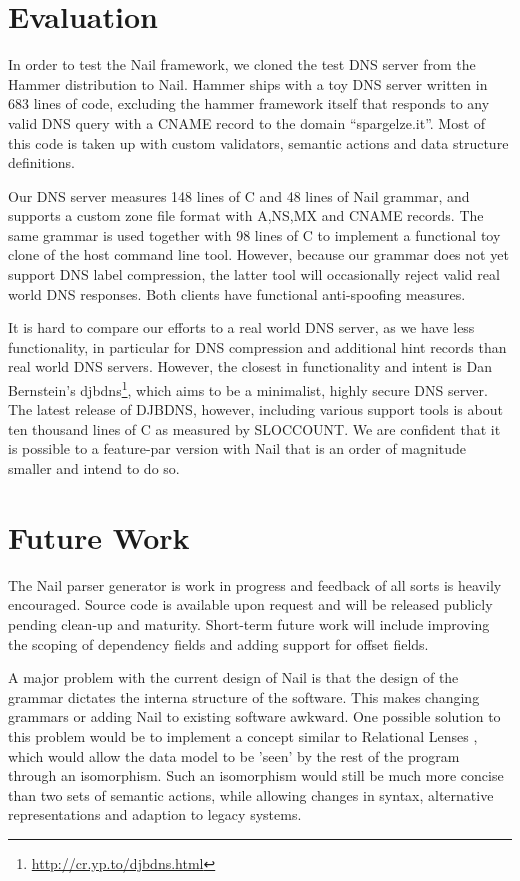 \documentclass[10pt]{article}
\begin{document}
\section{Evaluation}
In order to test the Nail framework, we cloned the test DNS server from the Hammer distribution to
Nail. Hammer ships with a toy DNS server written in 683 lines of code, excluding the hammer
framework itself that responds to any valid DNS query with a CNAME record to the domain
``spargelze.it''.  Most of this code is taken up with custom validators, semantic actions and data
structure definitions. 

Our DNS server measures 148 lines of C and 48 lines of Nail grammar, and supports a custom zone file format
with A,NS,MX and CNAME records. The same grammar is used together with 98 lines of C to implement a
functional toy clone of the host command line tool. However, because our grammar does not yet
support DNS label compression, the latter tool will occasionally reject valid real world DNS
responses. Both clients have functional anti-spoofing measures.

It is hard to compare our efforts to a real world DNS server, as we have less functionality, in
particular for DNS compression and additional hint records than real world DNS servers. 
However, the closest in functionality and intent is Dan Bernstein's djbdns\footnote{\url{http://cr.yp.to/djbdns.html}}, which aims
to be a minimalist, highly secure DNS server. The latest release of DJBDNS, however, including
various support tools is about ten thousand lines of C as measured by SLOCCOUNT. We are confident
that it is possible to a feature-par version with Nail that is an order of magnitude smaller and
intend to do so.


\section{Future Work}

The Nail parser generator is work in progress and feedback of all sorts is heavily
encouraged. Source code is available upon request and will be released publicly pending clean-up and
maturity. Short-term future work will include improving the scoping of dependency fields and adding
support for offset fields.

A major problem with the current design of Nail is that the design of the grammar dictates the
interna structure of the software. This makes changing grammars or adding Nail to existing software
awkward. One possible solution to this problem would be to implement a concept similar to Relational
Lenses \cite{bohannon2006relational}, which would allow  the data model to be 'seen' by
the rest of the program through an isomorphism. Such an isomorphism would still be much more concise
than two sets of semantic actions, while allowing changes in syntax, alternative representations
and adaption to legacy systems.
\end{document}

